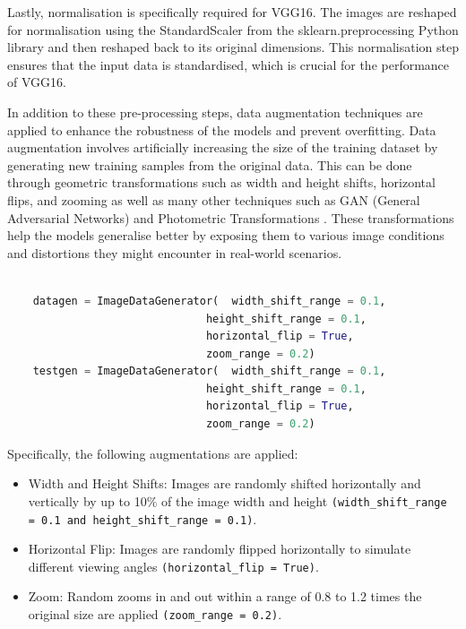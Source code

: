 Lastly, normalisation is specifically required for VGG16. The images are reshaped for normalisation using the StandardScaler from the sklearn.preprocessing Python library and then reshaped back to its original dimensions. This normalisation step ensures that the input data is standardised, which is crucial for the performance of VGG16.

In addition to these pre-processing steps, data augmentation techniques are applied to enhance the robustness of the models and prevent overfitting. Data augmentation involves artificially increasing the size of the training dataset by generating new training samples from the original data. This can be done through geometric transformations such as width and height shifts, horizontal flips, and zooming as well as many other techniques such as GAN (General Adversarial Networks) and Photometric Transformations \cite{Shorten2019-mj}. These transformations help the models generalise better by exposing them to various image conditions and distortions they might encounter in real-world scenarios.

\begin{lstlisting}[language=Python, basicstyle=\ttfamily\footnotesize]

    datagen = ImageDataGenerator(  width_shift_range = 0.1,
                               height_shift_range = 0.1,
                               horizontal_flip = True,
                               zoom_range = 0.2)
    testgen = ImageDataGenerator(  width_shift_range = 0.1,
                               height_shift_range = 0.1,
                               horizontal_flip = True,
                               zoom_range = 0.2)

\end{lstlisting}

Specifically, the following augmentations are applied:

\begin{itemize}
\item{} Width and Height Shifts: Images are randomly shifted horizontally and vertically by up to 10\% of the image width and height \texttt{(width\_shift\_range = 0.1 and height\_shift\_range = 0.1)}.
\item{} Horizontal Flip: Images are randomly flipped horizontally to simulate different viewing angles \texttt{(horizontal\_flip = True)}.
\item{} Zoom: Random zooms in and out within a range of 0.8 to 1.2 times the original size are applied \texttt{(zoom\_range = 0.2)}.
\end{itemize}

